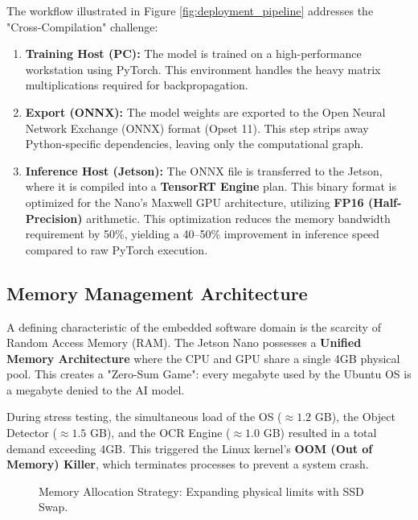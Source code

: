 The workflow illustrated in Figure \ref{fig:deployment_pipeline} addresses the "Cross-Compilation" challenge:
\begin{enumerate}
	\item \textbf{Training Host (PC):} The model is trained on a high-performance workstation using PyTorch. This environment handles the heavy matrix multiplications required for backpropagation.
	\item \textbf{Export (ONNX):} The model weights are exported to the Open Neural Network Exchange (ONNX) format (Opset 11). This step strips away Python-specific dependencies, leaving only the computational graph.
	\item \textbf{Inference Host (Jetson):} The ONNX file is transferred to the Jetson, where it is compiled into a \textbf{TensorRT Engine} plan. This binary format is optimized for the Nano's Maxwell GPU architecture, utilizing \textbf{FP16 (Half-Precision)} arithmetic. This optimization reduces the memory bandwidth requirement by 50\%, yielding a 40--50\% improvement in inference speed compared to raw PyTorch execution.
\end{enumerate}

\subsection{Memory Management Architecture}

A defining characteristic of the embedded software domain is the scarcity of Random Access Memory (RAM). The Jetson Nano possesses a \textbf{Unified Memory Architecture} where the CPU and GPU share a single 4GB physical pool. This creates a "Zero-Sum Game": every megabyte used by the Ubuntu OS is a megabyte denied to the AI model.

During stress testing, the simultaneous load of the OS ($\approx 1.2$ GB), the Object Detector ($\approx 1.5$ GB), and the OCR Engine ($\approx 1.0$ GB) resulted in a total demand exceeding 4GB. This triggered the Linux kernel's \textbf{OOM (Out of Memory) Killer}, which terminates processes to prevent a system crash.

\vspace{0.5cm}

\begin{figure}[htbp]
	\centering
	
	\caption{Memory Allocation Strategy: Expanding physical limits with SSD Swap.}
	\label{fig:memory_architecture}
\end{figure}

